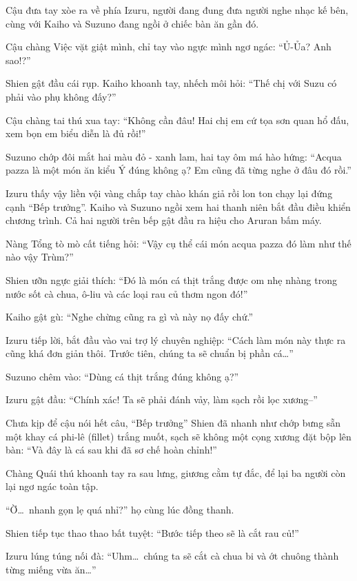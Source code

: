 \documentclass[../main.tex]{subfiles}
\begin{document}
Cậu đưa tay xòe ra về phía Izuru, người đang đung đưa người nghe nhạc kế bên, cùng với Kaiho và Suzuno đang ngồi ở chiếc bàn ăn gần đó.

Cậu chàng Việc vặt giật mình, chỉ tay vào ngực mình ngơ ngác: ``Ủ-Ủa? Anh sao!?''


Shien gật đầu cái rụp. Kaiho khoanh tay, nhếch môi hỏi: ``Thế chị với Suzu có phải vào phụ không đấy?''

Cậu chàng tai thú xua tay: ``Không cần đâu! Hai chị em cứ tọa sơn quan hổ đấu, xem bọn em biểu diễn là đủ rồi!''

Suzuno chớp đôi mắt hai màu đỏ - xanh lam, hai tay ôm má hào hứng: ``Acqua pazza là một món ăn kiểu Ý đúng không ạ? Em cũng đã từng nghe ở đâu đó rồi.''

Izuru thấy vậy liền vội vàng chắp tay chào khán giả rồi lon ton chạy lại đứng cạnh ``Bếp trưởng''. Kaiho và Suzuno ngồi xem hai thanh niên bắt đầu điều khiển chương trình. Cả hai người trên bếp gật đầu ra hiệu cho Aruran bấm máy.

Nàng Tổng tò mò cất tiếng hỏi: ``Vậy cụ thể cái món acqua pazza đó làm như thế nào vậy Trùm?''

Shien ưỡn ngực giải thích: ``Đó là món cá thịt trắng được om nhẹ nhàng trong nước sốt cà chua, ô-liu và các loại rau củ thơm ngon đó!''

Kaiho gật gù: ``Nghe chừng cũng ra gì và này nọ đấy chứ.''

Izuru tiếp lời, bắt đầu vào vai trợ lý chuyên nghiệp: ``Cách làm món này thực ra cũng khá đơn giản thôi. Trước tiên, chúng ta sẽ chuẩn bị phần cá\dots''

Suzuno chêm vào: ``Dùng cá thịt trắng đúng không ạ?''

Izuru gật đầu: ``Chính xác! Ta sẽ phải đánh vảy, làm sạch rồi lọc xương--''

Chưa kịp để cậu nói hết câu, ``Bếp trưởng'' Shien đã nhanh như chớp bưng sẵn một khay cá phi-lê (fillet) trắng muốt, sạch sẽ không một cọng xương đặt bộp lên bàn: ``Và đây là cá sau khi đã sơ chế hoàn chỉnh!''


Chàng Quái thú khoanh tay ra sau lưng, giương cằm tự đắc, để lại ba người còn lại ngơ ngác toàn tập.

``Ờ\dots\ nhanh gọn lẹ quá nhỉ?'' họ cùng lúc đồng thanh.

Shien tiếp tục thao thao bất tuyệt: ``Bước tiếp theo sẽ là cắt rau củ!''

Izuru lúng túng nối đà: ``Uhm\dots\ chúng ta sẽ cắt cà chua bi và ớt chuông thành từng miếng vừa ăn\dots''
\end{document}
